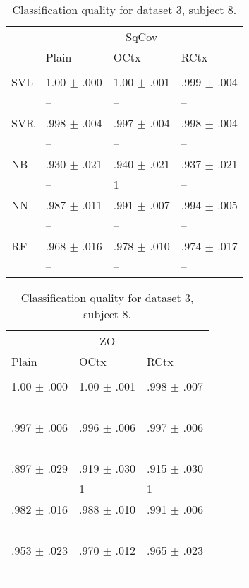 \begin{table}[htb]
\renewcommand{\arraystretch}{0.6}
\centering
\footnotesize
\caption{Classification quality for dataset 3, subject 8.\label{table:Set3_patient8_res}}
\begin{tabular}{llll}
 & \multicolumn{3}{c}{SqCov} \\
 & Plain & OCtx & RCtx \\
 \cmidrule(lr){2-4}\\
SVL & 1.00 $\pm$ .000 & 1.00 $\pm$ .001 & .999 $\pm$ .004 \\
 & -- & -- & -- \\
SVR & .998 $\pm$ .004 & .997 $\pm$ .004 & .998 $\pm$ .004 \\
 & -- & -- & -- \\
NB & .930 $\pm$ .021 & .940 $\pm$ .021 & .937 $\pm$ .021 \\
 & -- & {\scriptsize 1} & -- \\
NN & .987 $\pm$ .011 & .991 $\pm$ .007 & .994 $\pm$ .005 \\
 & -- & -- & -- \\
RF & .968 $\pm$ .016 & .978 $\pm$ .010 & .974 $\pm$ .017 \\
 & -- & -- & -- \\
\end{tabular}%
\begin{tabular}{lll}
  \multicolumn{3}{c}{ZO} \\
  Plain & OCtx & RCtx \\
  \cmidrule(lr){1-3}\\
1.00 $\pm$ .000 & 1.00 $\pm$ .001 & .998 $\pm$ .007 \\
  -- & -- & -- \\
 .997 $\pm$ .006 & .996 $\pm$ .006 & .997 $\pm$ .006 \\
  -- & -- & -- \\
 .897 $\pm$ .029 & .919 $\pm$ .030 & .915 $\pm$ .030 \\
  -- & {\scriptsize 1} & {\scriptsize 1} \\
 .982 $\pm$ .016 & .988 $\pm$ .010 & .991 $\pm$ .006 \\
  -- & -- & -- \\
 .953 $\pm$ .023 & .970 $\pm$ .012 & .965 $\pm$ .023 \\
  -- & -- & -- \\
\end{tabular}
\end{table}

